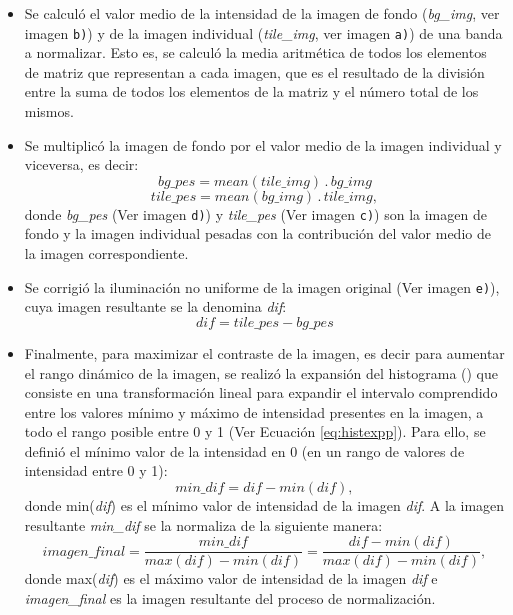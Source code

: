 \begin{itemize}
\justifying
\item Se calculó el valor medio de la intensidad de la imagen de fondo (\textit{bg\_img}, ver imagen \texttt{b)}) y de la imagen individual (\textit{tile\_img}, ver imagen \texttt{a)}) de una banda a normalizar. Esto es, se calculó la media aritmética de todos los elementos de matriz que representan a cada imagen, que es el resultado de la división entre la suma de todos los elementos de la matriz y el número total de los mismos.
\item Se multiplicó la imagen de fondo por el valor medio de la imagen individual y viceversa, es decir:
\begin{equation}
\textit{bg\_pes} = mean(\textit{tile\_img})\hspace{2pt} . \hspace{2pt}\textit{bg\_img}
\end{equation}
\begin{equation}
\textit{tile\_pes} = mean(\textit{bg\_img})\hspace{2pt} . \hspace{2pt}\textit{tile\_img},
\end{equation}
donde \textit{bg\_pes} (Ver imagen \texttt{d)}) y \textit{tile\_pes} (Ver imagen \texttt{c)}) son la imagen de fondo y la imagen individual pesadas con la contribución del valor medio de la imagen correspondiente.
\item Se corrigió la iluminación no uniforme de la imagen original (Ver imagen \texttt{e)}), cuya imagen resultante se la denomina \textit{dif}:
\begin{equation}
\textit{dif} = \textit{tile\_pes} - \textit{bg\_pes}
\end{equation}
\item Finalmente, para maximizar el contraste de la imagen, es decir para aumentar el rango dinámico de la imagen, se realizó la expansión del histograma (\cite{anilfund}) que consiste en una transformación lineal para expandir el intervalo comprendido entre los valores mínimo y máximo de intensidad presentes en la imagen, a todo el rango posible entre 0 y 1 (Ver Ecuación \ref{eq:histexpp}). Para ello, se definió el mínimo valor de la intensidad en 0 (en un rango de valores de intensidad entre 0 y 1):
\begin{equation}
	\textit{min\_dif} = \textit{dif} - min(\textit{dif}),
\end{equation}
donde min(\textit{dif}) es el mínimo valor de intensidad de la imagen \textit{dif}. A la imagen resultante \textit{min\_dif} se la normaliza de la siguiente manera:
\begin{equation}
	\textit{imagen\_final} = \frac{\textit{min\_dif}}{max(\textit{dif})-min(\textit{dif})} = \frac{\textit{dif} - min(\textit{dif})}{max(\textit{dif})-min(\textit{dif})},
	\label{eq:histexpp}
\end{equation}
donde max(\textit{dif}) es el máximo valor de intensidad de la imagen \textit{dif} e \textit{imagen\_final} es la imagen resultante del proceso de normalización.
\end{itemize}

